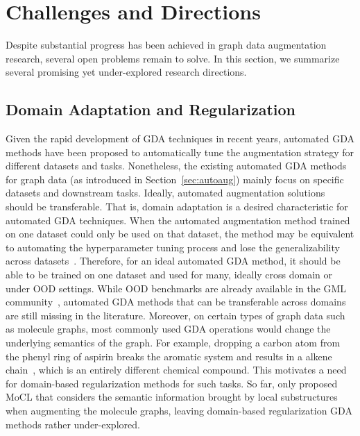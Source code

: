 \documentclass[11pt]{article}
\begin{document}
\section{Challenges and Directions}
\label{sec:future}
Despite substantial progress has been achieved in graph data augmentation research, several open problems remain to solve. In this section, we summarize several promising yet under-explored research directions.

\subsection{Domain Adaptation and Regularization}
Given the rapid development of GDA techniques in recent years, automated GDA methods have been proposed to automatically tune the augmentation strategy for different datasets and tasks. 
Nonetheless, the existing automated GDA methods for graph data (as introduced in Section~\ref{sec:autoaug}) mainly focus on specific datasets and downstream tasks. 
Ideally, automated augmentation solutions should be transferable. That is, domain adaptation is a desired characteristic for automated GDA techniques. When the automated augmentation method trained on one dataset could only be used on that dataset, the method may be equivalent to automating the hyperparameter tuning process and lose the generalizability across datasets~\cite{zhao2022autogda}. Therefore, for an ideal automated GDA method, it should be able to be trained on one dataset and used for many, ideally cross domain or under OOD settings. While OOD benchmarks are already available in the GML community~\cite{gui2022good}, automated GDA methods that can be transferable across domains are still missing in the literature. 
Moreover, on certain types of graph data such as molecule graphs, most commonly used GDA operations would change the underlying semantics of the graph. For example, dropping a carbon atom from the phenyl ring of aspirin breaks the aromatic system and results in a alkene chain~\cite{lee2021augmentation}, which is an entirely different chemical compound. This motivates a need for domain-based regularization methods for such tasks. So far, only \citet{sun2021mocl} proposed MoCL that considers the semantic information brought by local substructures when augmenting the molecule graphs, leaving domain-based regularization GDA methods rather under-explored.

\end{document}

